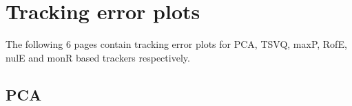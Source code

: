 \clearpage
\newpage
\section{Tracking error plots}
\label{App:tracking_error_plots}
The following 6 pages contain tracking error plots for PCA, TSVQ, maxP, RofE, nulE and monR based trackers respectively.

\clearpage
\newpage
\subsection{PCA}
\begin{figure}[h!]
\centering
\\

\end{figure}
